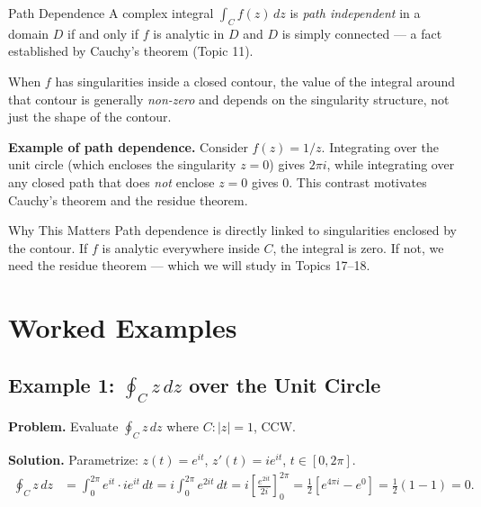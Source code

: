 \documentclass[12pt,a4paper]{article}
\begin{document}
\begin{infobox}{Path Dependence}
A complex integral $\int_C f(z)\,dz$ is \emph{path independent} in a domain
$D$ if and only if $f$ is analytic in $D$ and $D$ is simply connected --- a
fact established by Cauchy's theorem (Topic 11).

When $f$ has singularities inside a closed contour, the value of the integral
around that contour is generally \emph{non-zero} and depends on the singularity
structure, not just the shape of the contour.
\end{infobox}

\textbf{Example of path dependence.} Consider $f(z) = 1/z$. Integrating over
the unit circle (which encloses the singularity $z=0$) gives $2\pi i$, while
integrating over any closed path that does \emph{not} enclose $z=0$ gives $0$.
This contrast motivates Cauchy's theorem and the residue theorem.

\begin{learnbox}{Why This Matters}
Path dependence is directly linked to singularities enclosed by the contour.
If $f$ is analytic everywhere inside $C$, the integral is zero. If not, we need
the residue theorem --- which we will study in Topics 17--18.
\end{learnbox}

\section{Worked Examples}

\subsection*{Example 1: \(\oint_C z\,dz\) over the Unit Circle}

\textbf{Problem.} Evaluate $\displaystyle\oint_C z\,dz$ where $C : |z|=1$, CCW.

\textbf{Solution.} Parametrize: $z(t)=e^{it}$, $z'(t)=ie^{it}$, $t\in[0,2\pi]$.
\begin{align*}
\oint_C z\,dz &= \int_0^{2\pi} e^{it} \cdot ie^{it}\,dt
              = i\int_0^{2\pi} e^{2it}\,dt
              = i\left[\frac{e^{2it}}{2i}\right]_0^{2\pi}
              = \frac{1}{2}\left[e^{4\pi i}-e^{0}\right]
              = \frac{1}{2}(1-1) = 0.
\end{align*}
\end{document}
